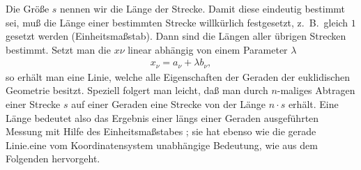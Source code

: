 
Die Größe $s$ nennen wir die Länge der Strecke. Damit diese eindeutig bestimmt 
sei, muß die Länge einer bestimmten Strecke willkürlich festgesetzt, z.\ B.\ 
gleich $1$ gesetzt werden (Einheitsmaßstab). Dann sind die Längen aller übrigen 
Strecken bestimmt. Setzt man die $x\nu$ linear abhängig von einem Parameter 
$\lambda$
\begin{align*}
    x_{\nu} = a_{\nu} + \lambda b_{\nu},
\end{align*}
so erhält man eine Linie, welche alle Eigenschaften der Geraden der euklidischen 
Geometrie besitzt. Speziell folgert man leicht, daß man durch $n$-maliges 
Abtragen einer Strecke $s$ auf einer Geraden eine Strecke von der Länge $n 
\cdot s$ erhält. Eine Länge bedeutet also das Ergebnis einer längs einer 
Geraden ausgeführten Messung mit Hilfe des Einheitsmaßstabes ; sie hat ebenso 
wie die gerade Linie.eine vom Koordinatensystem unabhängige Bedeutung, wie aus 
dem Folgenden hervorgeht.

